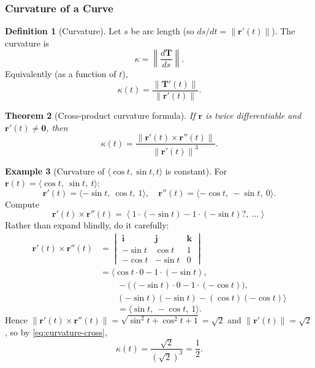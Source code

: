 \documentclass[12pt]{article}
\numberwithin{equation}{section}
\newcommand{\vect}[1]{\boldsymbol{#1}}   %
\newcommand{\norm}[1]{\left\lVert #1\right\rVert}
\theoremstyle{plain}
\newtheorem{theorem}{Theorem}[section]
\theoremstyle{definition}
\newtheorem{definition}[theorem]{Definition}
\newtheorem{example}[theorem]{Example}
\theoremstyle{remark}
\begin{document}
\subsubsection{Curvature of a Curve}

\begin{definition}[Curvature]\label{def:curvature}
Let $s$ be arc length (so $ds/dt=\norm{\vect r'(t)}$). The curvature is
\[
\kappa=\norm{\frac{d\vect T}{ds}}.
\]
Equivalently (as a function of $t$),
\begin{equation}\label{eq:curvature-t}
\kappa(t)=\frac{\norm{\vect T'(t)}}{\norm{\vect r'(t)}}.
\end{equation}
\end{definition}

\begin{theorem}[Cross-product curvature formula]\label{thm:curvature-cross}
If $\vect r$ is twice differentiable and $\vect r'(t)\neq \vect 0$, then
\begin{equation}\label{eq:curvature-cross}
\kappa(t)=\frac{\norm{\vect r'(t)\times \vect r''(t)}}{\norm{\vect r'(t)}^{3}}.
\end{equation}
\end{theorem}

\begin{example}[Curvature of $\langle \cos t,\sin t,t\rangle$ is constant]
For $\vect r(t)=\langle \cos t,\ \sin t,\ t\rangle$:
\[
\vect r'(t)=\langle -\sin t,\ \cos t,\ 1\rangle,\quad
\vect r''(t)=\langle -\cos t,\ -\sin t,\ 0\rangle.
\]
Compute
\[
\vect r'(t)\times \vect r''(t)
=
\left\langle
1\cdot(-\sin t)-1\cdot(-\sin t)?,\ \dots
\right\rangle
\]
Rather than expand blindly, do it carefully:
\begin{align*}
\vect r'(t)\times \vect r''(t) &=
\begin{vmatrix}
\vect i & \vect j & \vect k\\
-\sin t & \cos t & 1\\
-\cos t & -\sin t & 0
\end{vmatrix} \\
&= \bigl\langle
\cos t\cdot 0-1\cdot(-\sin t), \\
&\quad\quad -\bigl((-\sin t)\cdot 0-1\cdot(-\cos t)\bigr), \\
&\quad\quad (-\sin t)(-\sin t)-(\cos t)(-\cos t)
\bigr\rangle
\end{align*}
\[
=\langle \sin t,\ -\cos t,\ 1\rangle.
\]
Hence $\norm{\vect r'(t)\times \vect r''(t)}=\sqrt{\sin^2 t+\cos^2 t+1}=\sqrt{2}$ and
$\norm{\vect r'(t)}=\sqrt{2}$, so by \cref{eq:curvature-cross},
\[
\kappa(t)=\frac{\sqrt{2}}{(\sqrt{2})^3}=\frac{1}{2}.
\]
\end{example}
\end{document}
